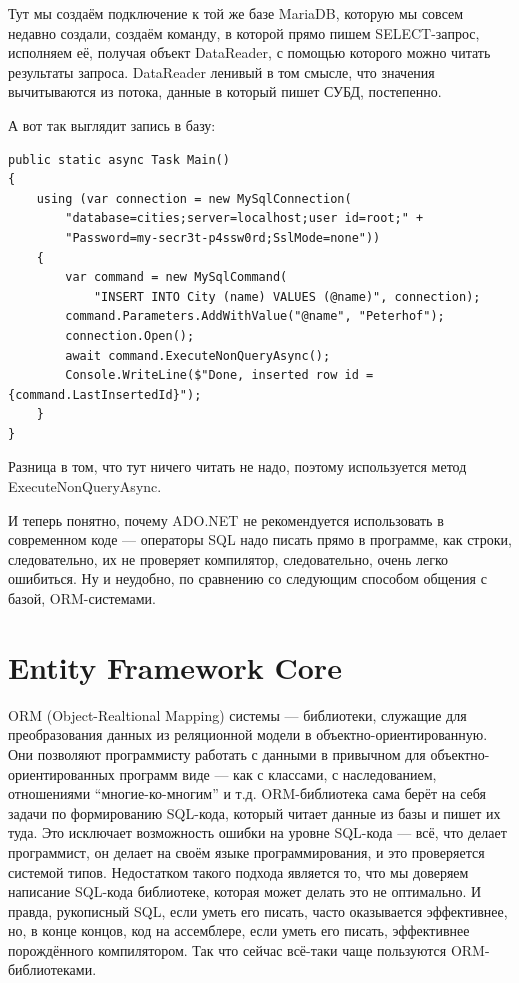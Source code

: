 \documentclass{../../text-style}
\begin{document}
Тут мы создаём подключение к той же базе MariaDB, которую мы совсем недавно создали, создаём команду, в которой прямо пишем SELECT-запрос, исполняем её, получая объект DataReader, с помощью которого можно читать результаты запроса. DataReader ленивый в том смысле, что значения вычитываются из потока, данные в который пишет СУБД, постепенно.

А вот так выглядит запись в базу:

\begin{verbatim}
public static async Task Main()
{
    using (var connection = new MySqlConnection(
        "database=cities;server=localhost;user id=root;" +
        "Password=my-secr3t-p4ssw0rd;SslMode=none"))
    {
        var command = new MySqlCommand(
            "INSERT INTO City (name) VALUES (@name)", connection);
        command.Parameters.AddWithValue("@name", "Peterhof");
        connection.Open();
        await command.ExecuteNonQueryAsync();
        Console.WriteLine($"Done, inserted row id = {command.LastInsertedId}");
    }
}
\end{verbatim}

Разница в том, что тут ничего читать не надо, поэтому используется метод ExecuteNonQueryAsync.

И теперь понятно, почему ADO.NET не рекомендуется использовать в современном коде --- операторы SQL надо писать прямо в программе, как строки, следовательно, их не проверяет компилятор, следовательно, очень легко ошибиться. Ну и неудобно, по сравнению со следующим способом общения с базой, ORM-системами.

\section{Entity Framework Core}

ORM (Object-Realtional Mapping) системы --- библиотеки, служащие для преобразования данных из реляционной модели в объектно-ориентированную. Они позволяют программисту работать с данными в привычном для объектно-ориентированных программ виде --- как с классами, с наследованием, отношениями ``многие-ко-многим'' и т.д. ORM-библиотека сама берёт на себя задачи по формированию SQL-кода, который читает данные из базы и пишет их туда. Это исключает возможность ошибки на уровне SQL-кода --- всё, что делает программист, он делает на своём языке программирования, и это проверяется системой типов. Недостатком такого подхода является то, что мы доверяем написание SQL-кода библиотеке, которая может делать это не оптимально. И правда, рукописный SQL, если уметь его писать, часто оказывается эффективнее, но, в конце концов, код на ассемблере, если уметь его писать, эффективнее порождённого компилятором. Так что сейчас всё-таки чаще пользуются ORM-библиотеками.
\end{document}
